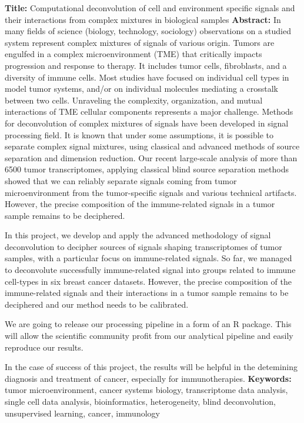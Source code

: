 \documentclass[12pt,]{book}
\theoremstyle{definition}
\theoremstyle{definition}
\theoremstyle{definition}
\theoremstyle{remark}
\begin{document}
\begin{titlepage}
\clearpage


\newpage
\thispagestyle{empty}
\noindent %
\textbf{Title: }
Computational deconvolution of cell and environment specific signals and their interactions from complex mixtures in biological samples
\vskip 1cm
\noindent
\textbf{Abstract:}
In many fields of science (biology, technology, sociology) observations on a studied system represent complex mixtures of signals of various origin. Tumors are engulfed in a complex microenvironment (TME) that critically impacts progression and response to therapy. It includes tumor cells, fibroblasts, and a diversity of immune cells. Most studies have focused on individual cell types in model tumor systems, and/or on individual molecules mediating a crosstalk between two cells. Unraveling the complexity, organization, and mutual interactions of TME cellular components represents a major challenge.
Methods for deconvolution of complex mixtures of signals have been developed in signal processing field. It is known that under some assumptions, it is possible to separate complex signal mixtures, using classical and advanced methods of source separation and dimension reduction. Our recent large-scale analysis of more than 6500 tumor transcriptomes, applying classical blind source separation methods showed that we can reliably separate signals coming from tumor microenvironment from the tumor-specific signals and various technical artifacts. However, the precise composition of the immune-related signals in a tumor sample remains to be deciphered.

In this project, we develop and apply the advanced methodology of signal deconvolution to decipher sources of signals shaping transcriptomes of tumor samples, with a particular focus on immune-related signals. So far, we managed to deconvolute successfully immune-related signal into groups related to immune cell-types in six breast cancer datasets. However, the precise composition of the immune-related signals and their interactions in a tumor sample remains to be deciphered and our method needs to be calibrated.

We are going to release our processing pipeline in a form of an R package. This will allow the scientific community profit from our analytical pipeline and easily reproduce our results.

In the case of success of this project, the results will be helpful in the detemining diagnosis and treatment of cancer, especially for immunotherapies.
\vskip 1cm
\noindent
\textbf{Keywords:} tumor microenvironment, cancer systems biology, transcriptome data analysis, single cell data analysis, bioinformatics, heterogeneity, blind deconvolution, unsupervised learning, cancer, immunology



\end{titlepage}
\end{document}
